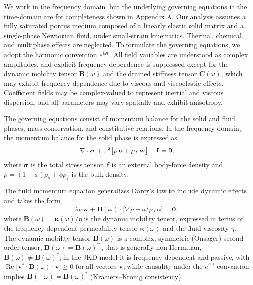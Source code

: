 \documentclass[pdflatex,sn-mathphys-num]{sn-jnl}
\theoremstyle{thmstyleone}%
\theoremstyle{thmstyletwo}%
\theoremstyle{thmstylethree}%
\theoremstyle{definition}
\begin{document}
	
	We work in the frequency domain, but the underlying governing equations in the time-domain are for completeness shown in Appendix A. 
	Our analysis assumes a fully saturated porous medium composed of a linearly elastic solid matrix and a single-phase Newtonian fluid, under small-strain kinematics. Thermal, chemical, and multiphase effects are neglected. To formulate the governing equations, we adopt the harmonic convention \( e^{i\omega t} \). All field variables are understood as complex amplitudes, and explicit frequency dependence is suppressed except for the dynamic mobility tensor \( \mathbf{B}(\omega) \) and the drained stiffness tensor \( \mathbf{C}(\omega) \), which may exhibit frequency dependence due to viscous and viscoelastic effects. Coefficient fields may be complex-valued to represent inertial and viscous dispersion, and all parameters may vary spatially and exhibit anisotropy.
	
	The governing equations consist of momentum balance for the solid and fluid phases, mass conservation, and constitutive relations. In the frequency-domain, the momentum balance for the solid phase is expressed as
	\begin{equation}
		\nabla \cdot \boldsymbol{\sigma} + \omega^2\big[\rho\,\mathbf{u} + \rho_f\,\mathbf{w}\big] + \mathbf{f} = {\bf 0},
		\label{eq:solid_momentum_mod}
	\end{equation}
	where  \( \boldsymbol{\sigma} \) is the total stress tensor, \( \mathbf{f} \) is an external body-force density and
	\( \rho = (1-\phi)\rho_s + \phi\rho_f \) is the bulk density.
	
	The fluid momentum equation generalizes Darcy’s law to include dynamic effects and takes the form
	\begin{equation}
		i\omega\,\mathbf{w} + \mathbf{B}(\omega)\cdot\big[\nabla p - \omega^2\rho_f\,\mathbf{u}\big] = \mathbf{0},
		\label{eq:fluid_momentum_mod}
	\end{equation}
	where \( \mathbf{B}(\omega)=\boldsymbol{\kappa}(\omega)/\eta \) is the dynamic mobility tensor, expressed in terms of the frequency-dependent permeability tensor \( \boldsymbol{\kappa}(\omega) \) and the fluid viscosity \( \eta \). The dynamic mobility tensor $\mathbf{B}(\omega)$ is a complex, symmetric (Onsager) second-order tensor, $\mathbf{B}(\omega)=\mathbf{B}(\omega)^{\top}$, that is generally non-Hermitian, $\mathbf{B}(\omega)\neq\mathbf{B}(\omega)^{\dagger}$; in the JKD model it is frequency dependent and passive, with $\operatorname{Re}\!\big[\mathbf{v}^{*}\!\cdot\!\mathbf{B}(\omega)\!\cdot\!\mathbf{v}\big]\ge 0$ for all vectors $\mathbf{v}$, while causality under the $e^{i\omega t}$ convention implies $\mathbf{B}(-\omega)=\mathbf{B}(\omega)^{*}$ (Kramers–Kronig consistency).
	
\end{document}

